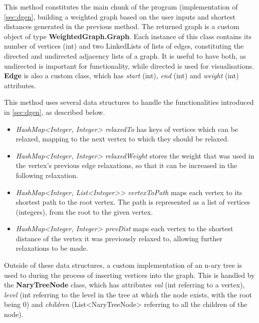 \documentclass{l4proj}
\begin{document}
This method constitutes the main chunk of the program (implementation of \autoref{sec:dgen}, building a weighted graph based on the user inputs and shortest distances generated in the previous method. The returned graph is a custom object of type \textbf{WeightedGraph.Graph}. Each instance of this class contains its number of vertices (int) and two LinkedLists of lists of edges, constituting the directed and undirected adjacency lists of a graph. It is useful to have both, as undirected is important for functionality, while directed is used for visualisations. \textbf{Edge} is also a custom class, which has \emph{start} (int), \emph{end} (int) and \emph{weight} (int) attributes.

This method uses several data structures to handle the functionalities introduced in \autoref{sec:dgen}, as described below.
\begin{itemize}
	\item
	\emph{HashMap<Integer, Integer> relaxedTo} has keys of vertices which can be relaxed, mapping to the next vertex to which they should be relaxed.
	\item
	\emph{HashMap<Integer, Integer> relaxedWeight} stores the weight that was used in the vertex's previous edge relaxations, so that it can be increased in the following relaxation.
	\item
	\emph{HashMap<Integer, List<Integer>> vertexToPath} maps each vertex to its shortest path to the root vertex. The path is represented as a list of vertices (integers), from the root to the given vertex.
	\item
	\emph{HashMap<Integer, Integer> prevDist} maps each vertex to the shortest distance of the vertex it was previously relaxed to, allowing further relaxations to be made.
\end{itemize}

Outside of these data structures, a custom implementation of an n-ary tree is used to during the process of inserting vertices into the graph. This is handled by the \textbf{NaryTreeNode} class, which has attributes \emph{val} (int referring to a vertex), \emph{level} (int referring to the level in the tree at which the node exists, with the root being $0$) and \emph{children} (List<NaryTreeNode> referring to all the children of the node). 
\end{document}
